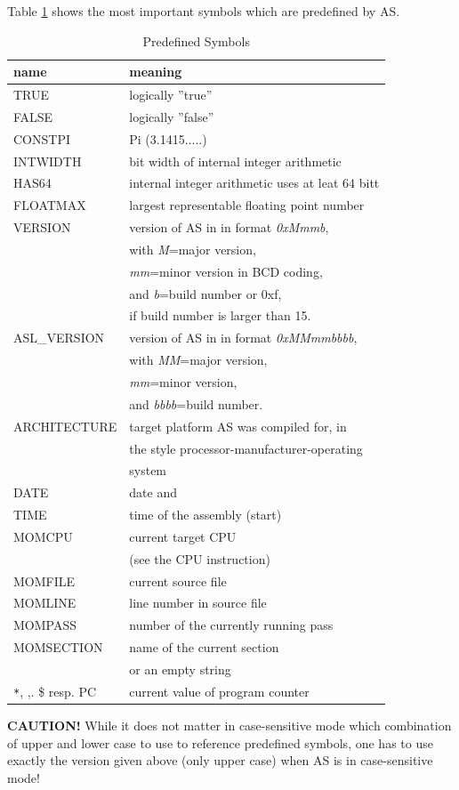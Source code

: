 \documentclass[12pt,twoside]{report}
\newcommand{\bb}[1]{{\bf #1}}
\newcommand{\asname}{{AS}}
\begin{document}
Table \ref{TabPredefined} shows the most important symbols which are
predefined by \asname{}.
\begin{table}[htb]
\begin{center}\begin{tabular}{|l|l|}
\hline
name          & meaning \\
\hline
\hline
TRUE          & logically ''true'' \\
FALSE         & logically ''false'' \\
CONSTPI       & Pi (3.1415.....) \\
INTWIDTH      & bit width of internal integer arithmetic \\
HAS64         & internal integer arithmetic uses at leat 64 bitt \\
FLOATMAX      & largest representable floating point number \\
VERSION       & version of \asname{} in in format {\em 0xMmmb}, \\
              & with {\em M}=major version, \\
              & {\em mm}=minor version in BCD coding, \\
              & and {\em b}=build number or 0xf, \\
              & if build number is larger than 15. \\
ASL\_VERSION  & version of \asname{} in in format {\em 0xMMmmbbbb}, \\
              & with {\em MM}=major version, \\
              & {\em mm}=minor version, \\
              & and {\em bbbb}=build number. \\
ARCHITECTURE  & target platform \asname{} was compiled for, in \\
              & the style processor-manufacturer-operating \\
              & system \\
DATE          & date and \\
TIME          & time of the assembly (start) \\
MOMCPU        & current target CPU \\
              & (see the CPU instruction) \\
MOMFILE       & current source file \\
MOMLINE       & line number in source file \\
MOMPASS       & number of the currently running pass \\
MOMSECTION    & name of the current section \\
              & or an empty string \\
\verb!*!, ,. \$ resp. PC & current value of program counter \\
\hline
\end{tabular}\end{center}
\caption{Predefined Symbols\label{TabPredefined}}
\end{table}
\bb{CAUTION!}  While it does not matter in case-sensitive mode which
combination of upper and lower case to use to reference predefined
symbols, one has to use exactly the version given above (only upper
case) when \asname{} is in case-sensitive mode!
\end{document}
